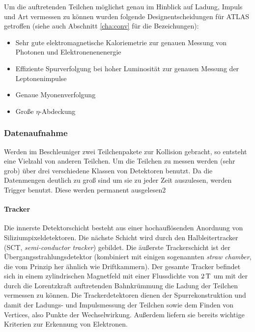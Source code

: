 Um die auftretenden Teilchen möglichst genau im Hinblick auf Ladung, Impuls und
Art vermessen zu können wurden folgende Designentscheidungen für ATLAS
getroffen\cite{atlas-tp} (siehe auch Abschnitt \ref{cha:conv} für die
Bezeichungen):
\begin{itemize}
  \item Sehr gute elektromagnetische Kaloriemetrie zur genauen Messung von
    Photonen und Elektronenenenergie
  \item Effiziente Spurverfolgung bei hoher Luminosität zur genauen Messung der
    Leptonenimpulse
  \item Genaue Myonenverfolgung
  \item Große $\eta$-Abdeckung 
\end{itemize}

\subsubsection{Datenaufnahme}
\label{cha:aufnahme}
Werden im Beschleuniger zwei Teilchenpakete zur Kollision gebracht, so entsteht
eine Vielzahl von anderen Teilchen. Um die Teilchen zu messen werden (sehr grob)
über drei verschiedene Klassen von Detektoren benutzt. Da die Datenmengen
deutlich zu groß sind um sie zu jeder Zeit auszulesen, werden Trigger benutzt.
Diese werden permanent ausgelesen2

\paragraph{Tracker}
Die innerste Detektorschicht besteht aus einer hochauflösenden Anordnung von
Siliziumpixeldetektoren. Die nächste Schicht wird durch den Halbleitertracker
(SCT, \emph{semi-conductor tracker}) gebildet. Die äußerste Trackerschicht ist
der Übergangsstrahlungsdetektor (kombiniert mit einigen sogenannten \emph{straw
chamber}, die vom Prinzip her ähnlich wie Driftkammern). Der gesamte Tracker
befindet sich in einem zylindrischen Magnetfeld mit einer Flussdichte von
$\unit[2]{T}$ um mit der durch die Lorentzkraft auftretenden Bahnkrümmung die
Ladung der Teilchen vermessen zu können. Die Trackerdetektoren dienen der
Spurrekonstruktion und damit der Ladungs- und Impulsmessung der Teilchen sowie
dem Finden von Vertices, also Punkte der Wechselwirkung. Außerdem liefern sie
bereits wichtige Kriterien zur Erkennung von Elektronen.

